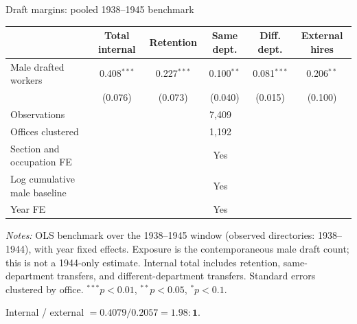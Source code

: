 \begin{frame}[t]{Draft margins: pooled 1938--1945 benchmark}
\tiny\centering
\begin{threeparttable}
\begin{tabular}{lccccc}
\toprule
 & Total internal & Retention & Same dept. & Diff. dept. & External hires \\
\midrule
Male drafted workers & 0.408$^{***}$ & 0.227$^{***}$ & 0.100$^{**}$ & 0.081$^{***}$ & 0.206$^{**}$ \\
 & (0.076) & (0.073) & (0.040) & (0.015) & (0.100) \\
\midrule
Observations & \multicolumn{5}{c}{7,409} \\
Offices clustered & \multicolumn{5}{c}{1,192} \\
Section and occupation FE & \multicolumn{5}{c}{Yes} \\
Log cumulative male baseline & \multicolumn{5}{c}{Yes} \\
Year FE & \multicolumn{5}{c}{Yes} \\
\bottomrule
\end{tabular}
\begin{tablenotes}[flushleft]
\tiny\item \textit{Notes:} OLS benchmark over the 1938--1945 window (observed directories: 1938--1944), with year fixed effects. Exposure is the contemporaneous male draft count; this is not a 1944-only estimate. Internal total includes retention, same-department transfers, and different-department transfers. Standard errors clustered by office. $^{***}p<0.01$, $^{**}p<0.05$, $^{*}p<0.1$.
\end{tablenotes}
\end{threeparttable}
\vspace{2mm}
\par Internal / external $= 0.4079 / 0.2057 = \mathbf{1.98:1}$.
\end{frame}

